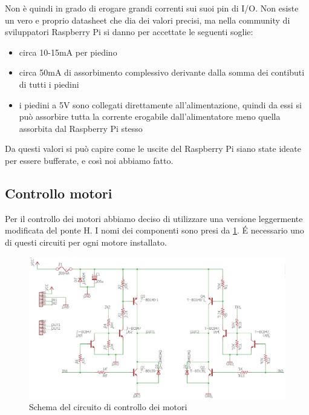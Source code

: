 \documentclass[12pt]{article}
\newcommand{\raspi}{Raspberry Pi}
\begin{document}
Non è quindi in grado di erogare grandi correnti sui suoi pin di I/O. Non esiste un vero e proprio datasheet che dia dei valori precisi, ma nella community di sviluppatori \raspi{} si danno per accettate le seguenti soglie:
\begin{itemize}
\item circa 10-15mA per piedino
\item circa 50mA di assorbimento complessivo derivante dalla somma dei contibuti di tutti i piedini
\item i piedini a 5V sono collegati direttamente all'alimentazione, quindi da essi si può assorbire tutta la corrente erogabile dall'alimentatore meno quella assorbita dal \raspi{} stesso
\end{itemize}

Da questi valori si può capire come le uscite del \raspi{} siano state ideate per essere bufferate, e così noi abbiamo fatto.

\subsection{Controllo motori}
Per il controllo dei motori abbiamo deciso di utilizzare una versione leggermente modificata del ponte H. I nomi dei componenti sono presi da \cref{fig:ponteH}. \'E necessario uno di questi circuiti per ogni motore installato.

\begin{figure}[h]
\includegraphics[width=\textwidth]{SchemaH}
\centering
\caption{Schema del circuito di controllo dei motori}
\label{fig:ponteH}
\end{figure}
\end{document}
